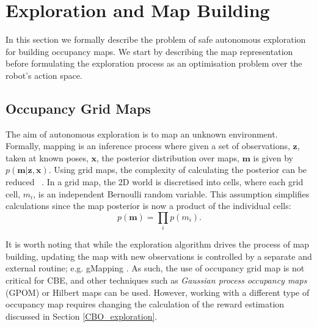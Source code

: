\documentclass[shortAfour,sageh,times]{sagej_no_sage}
\begin{document}
\section{Exploration and Map Building}
\label{sec:explo}
In this section we formally describe the problem of safe autonomous exploration for building occupancy maps. 
We start by describing the map representation before formulating the exploration process as an optimisation problem over the robot's action space.
\subsection{Occupancy Grid Maps}
The aim of autonomous exploration is to map an unknown environment. Formally, mapping is an inference process where given 
a set of observations, $\boldsymbol{z}$, taken at known poses, $\boldsymbol{x}$, the posterior distribution over maps, $\boldsymbol{m}$ is given by $p(\boldsymbol{m}|\boldsymbol{z},\boldsymbol{x})$.
Using grid maps, the complexity of calculating the posterior can be reduced ~\citep{Thrun2005a}. In a grid map, the 2D world is discretised 
into cells, where each grid cell, $m_i$, is an independent Bernoulli random variable. This assumption simplifies calculations since the map posterior is now a product of the individual cells:
\begin{equation}\label{fig:general_map}
	p(\boldsymbol{m}) = \prod_{i}p(m_i).
\end{equation}

It is worth noting that while the exploration algorithm drives the process of map building, updating the map with new observations is controlled by a separate and external routine; e.g. gMapping \citep{Grisetti2007}. As such, the use of occupancy grid map is not critical for CBE, and other techniques such as \textit{Gaussian process occupancy maps} (GPOM) \citep{OCallaghan2012} or Hilbert maps \citep{ramos2015hilbert} can be used. However, working with a different type of occupancy map requires changing the calculation of the reward estimation discussed in Section \ref{CBO_exploration}.
  
\end{document}
